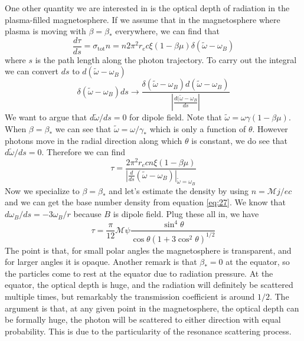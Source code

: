 \documentclass[letterpaper, 11pt]{article}
\numberwithin{equation}{section}
\numberwithin{figure}{section}
\begin{document}
One other quantity we are interested in is the optical depth of radiation in the plasma-filled magnetosphere. If we assume that in the magnetosphere where plasma is moving with $\beta = \beta_{*}$ everywhere, we can find that
\begin{equation}
    \label{eq:75}
    \frac{d\tau}{ds} = \sigma_\mathrm{tot} n = n 2\pi^2r_ec\xi(1 - \beta\mu)\delta(\tilde{\omega} - \omega_B)
\end{equation}
where $s$ is the path length along the photon trajectory. To carry out the integral we can convert $ds$ to $d(\tilde{\omega} - \omega_B)$
\begin{equation}
    \label{eq:76}
    \delta(\tilde{\omega} - \omega_B)ds \longrightarrow \frac{\delta(\tilde{\omega} - \omega_B)d(\tilde{\omega} - \omega_B)}{\left| \frac{d(\tilde{\omega} - \omega_B}{ds} \right|}
\end{equation}
We want to argue that $d\tilde{\omega}/ds = 0$ for dipole field. Note that $\tilde{\omega} = \omega\gamma(1 - \beta\mu)$. When $\beta = \beta_{*}$ we can see that $\tilde{\omega} = \omega / \gamma_{*}$ which is only a function of $\theta$. However photons move in the radial direction along which $\theta$ is constant, we do see that $d\tilde{\omega}/ds = 0$. Therefore we can find
\begin{equation}
    \label{eq:77}
    \tau = \frac{2\pi^2r_ecn\xi(1 - \beta\mu)}{\left| \frac{d}{ds}(\tilde{\omega} - \omega_B) \right|_{\tilde{\omega} = \omega_B}}
\end{equation}
Now we specialize to $\beta = \beta_{*}$ and let's estimate the density by using $n = \mathcal{M}j/ec$ and we can get the base number density from equation \eqref{eq:27}. We know that $d\omega_B/ds = -3\omega_B/r$ because $B$ is dipole field. Plug these all in, we have
\begin{equation}
    \label{eq:78}
    \tau = \frac{\pi}{12}\mathcal{M}\psi \frac{\sin^4\theta}{\cos\theta(1 + 3\cos^2\theta)^{1/2}}
\end{equation}
The point is that, for small polar angles the magnetosphere is transparent, and for larger angles it is opaque. Another remark is that $\beta_{*} = 0$ at the equator, so the particles come to rest at the equator due to radiation pressure. At the equator, the optical depth is huge, and the radiation will definitely be scattered multiple times, but remarkably the transmission coefficient is around $1/2$. The argument is that, at any given point in the magnetosphere, the optical depth can be formally huge, the photon will be scattered to either direction with equal probability. This is due to the particularity of the resonance scattering process.
\end{document}
